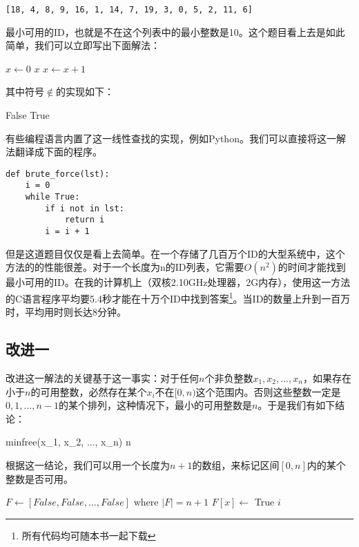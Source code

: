 \documentclass[UTF8]{article}
\begin{document}
\begin{verbatim}
[18, 4, 8, 9, 16, 1, 14, 7, 19, 3, 0, 5, 2, 11, 6]
\end{verbatim}

最小可用的ID，也就是不在这个列表中的最小整数是10。这个题目看上去是如此简单，我们可以立即写出下面解法：

\begin{algorithmic}[1]
  \State $x \gets 0$
  \Loop
      \State \Return $x$
    \Else
      \State $x \gets x + 1$
    \EndIf
  \EndLoop
\EndFunction
\end{algorithmic}

其中符号$\notin$的实现如下：

\begin{algorithmic}[1]
      \State \Return False
    \EndIf
  \EndFor
  \State \Return True
\EndFunction
\end{algorithmic}

有些编程语言内置了这一线性查找的实现，例如Python。我们可以直接将这一解法翻译成下面的程序。

\lstset{language=Python}
\begin{lstlisting}
def brute_force(lst):
    i = 0
    while True:
        if i not in lst:
            return i
        i = i + 1
\end{lstlisting}

但是这道题目仅仅是看上去简单。在一个存储了几百万个ID的大型系统中，这个方法的的性能很差。对于一个长度为n的ID列表，它需要$O(n^2)$的时间才能找到最小可用的ID。在我的计算机上（双核2.10GHz处理器，2G内存），使用这一方法的C语言程序平均要5.4秒才能在十万个ID中找到答案\footnote{所有代码均可随本书一起下载}。当ID的数量上升到一百万时，平均用时则长达8分钟。

\subsection{改进一}
改进这一解法的关键基于这一事实：对于任何$n$个非负整数$x_1, x_2, ..., x_n$，如果存在小于$n$的可用整数，必然存在某个$x_i$不在$[0, n)$这个范围内。否则这些整数一定是$0, 1, ..., n-1$的某个排列，这种情况下，最小的可用整数是$n$。于是我们有如下结论：

\be
minfree(x_1, x_2, ..., x_n) \leq n
\label{eq:min-free}
\ee

根据这一结论，我们可以用一个长度为$n+1$的数组，来标记区间$[0, n]$内的某个整数是否可用。

\begin{algorithmic}[1]
  \State $F \gets [False, False, ..., False]$ where $|F| = n+1$
      \State $F[x] \gets$ True
    \EndIf
  \EndFor
      \State \Return $i$
    \EndIf
  \EndFor
\EndFunction
\end{algorithmic}
\end{document}
